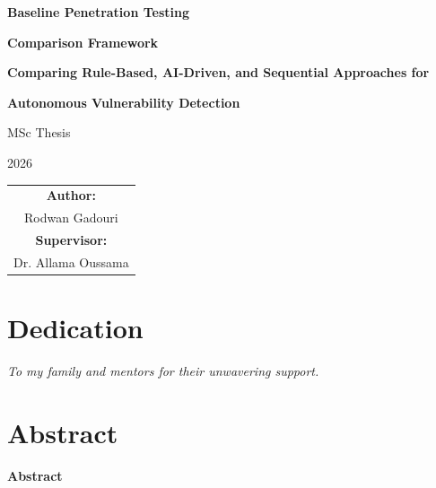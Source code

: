 \documentclass[12pt,a4paper,oneside]{book}
\begin{document}
\frontmatter
{}

\begin{titlepage}
\begin{center}
\vspace*{2cm}
{\Huge\bfseries\color{navy} Baseline Penetration Testing\par}
\vspace{0.5cm}
{\Huge\bfseries\color{navy} Comparison Framework\par}
\vspace{2cm}
{\LARGE\bfseries Comparing Rule-Based, AI-Driven, and Sequential Approaches for\par}
\vspace{0.5cm}
{\LARGE\bfseries Autonomous Vulnerability Detection\par}
\vspace{3cm}
{\Large MSc Thesis\par}
\vspace{1cm}
{\Large 2026\par}
\vspace{3cm}
\begin{tabular}{c}
{\Large\bfseries Author:} \\[0.3cm]
{\Large Rodwan Gadouri} \\[1cm]
{\Large\bfseries Supervisor:} \\[0.3cm]
{\Large Dr. Allama Oussama}
\end{tabular}
\vfill
\end{center}
\end{titlepage}

\cleardoublepage

\chapter*{Dedication}
\vspace{1cm}
\begin{center}
\textit{To my family and mentors for their unwavering support.}
\end{center}

\cleardoublepage

\chapter*{Abstract}
\vspace{1cm}
\begin{center}
\textbf{\Large Abstract}
\end{center}
\vspace{0.5cm}
\end{document}
